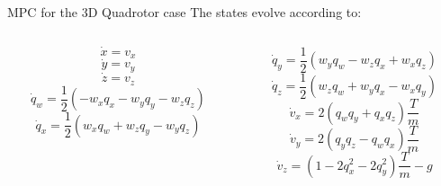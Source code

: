 \documentclass{thesisbeamer}
\begin{document}
\begin{frame}[t]{MPC for the 3D Quadrotor case} \vspace{4pt}
    The states evolve according to:
    \begin{columns}
        \begin{column}{0.5\textwidth}
            \begin{equation*}
                \dot{x} = v_x
            \end{equation*}
            \begin{equation*}
                \dot{y} = v_y
            \end{equation*}
            \begin{equation*}
                \dot{z} = v_z
            \end{equation*}
            \begin{equation*}
                \dot{q}_w=\frac{1}{2}( - w_x q_x - w_y q_y - w_z q_z)
            \end{equation*}
            \begin{equation*}
                \dot{q}_x=\frac{1}{2}( w_x q_w + w_z q_y - w_y q_z)
            \end{equation*}
        \end{column}
        \begin{column}{0.5\textwidth}
            \begin{equation*}
                \dot{q}_y=\frac{1}{2}( w_y q_w - w_z q_x + w_x q_z)
            \end{equation*}
            \begin{equation*}
                \dot{q}_z=\frac{1}{2}( w_z q_w + w_y q_x - w_x q_y)
            \end{equation*}
            \begin{equation*}
                \dot{v}_x = 2( q_w q_y + q_x q_z )\frac{T}{m}
            \end{equation*}
            \begin{equation*}
                \dot{v}_y = 2(q_y q_z - q_w q_x )\frac{T}{m}
            \end{equation*}
            \begin{equation*}
                \dot{v}_z = ( 1 - 2 q_x^2 - 2 q_y^2 )\frac{T}{m} - g
            \end{equation*}
        \end{column}
    \end{columns}
\end{frame}
\end{document}
